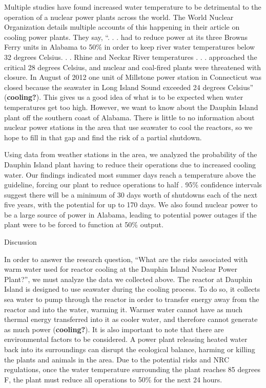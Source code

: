 \documentclass[
  letterpaper,
  DIV=11,
  numbers=noendperiod]{scrreprt}
\begin{document}
Multiple studies have found increased water temperature to be
detrimental to the operation of a nuclear power plants across the world.
The World Nuclear Organization details multiple accounts of this
happening in their article on cooling power plants. They say, ``. . .
had to reduce power at its three Browns Ferry units in Alabama to 50\%
in order to keep river water temperatures below 32 degrees Celsius. . .
Rhine and Neckar River temperatures . . . approached the critical 28
degrees Celsius, and nuclear and coal-fired plants were threatened with
closure. In August of 2012 one unit of Millstone power station in
Connecticut was closed because the seawater in Long Island Sound
exceeded 24 degrees Celsius'' (\textbf{cooling?}). This gives us a good
idea of what is to be expected when water temperatures get too high.
However, we want to know about the Dauphin Island plant off the southern
coast of Alabama. There is little to no information about nuclear power
stations in the area that use seawater to cool the reactors, so we hope
to fill in that gap and find the risk of a partial shutdown.

Using data from weather stations in the area, we analyzed the
probability of the Dauphin Island plant having to reduce their
operations due to increased cooling water. Our findings indicated most
summer days reach a temperature above the guideline, forcing our plant
to reduce operations to half . 95\% confidence intervals suggest there
will be a minimum of 30 days worth of shutdowns each of the next five
years, with the potential for up to 170 days. We also found nuclear
power to be a large source of power in Alabama, leading to potential
power outages if the plant were to be forced to function at 50\% output.

Discussion

In order to answer the research question, ``What are the risks
associated with warm water used for reactor cooling at the Dauphin
Island Nuclear Power Plant?'', we must analyze the data we collected
above. The reactor at Dauphin Island is designed to use seawater during
the cooling process. To do so, it collects sea water to pump through the
reactor in order to transfer energy away from the reactor and into the
water, warming it. Warmer water cannot have as much thermal energy
transferred into it as cooler water, and therefore cannot generate as
much power (\textbf{cooling?}). It is also important to note that there
are environmental factors to be considered. A power plant releasing
heated water back into its surroundings can disrupt the ecological
balance, harming or killing the plants and animals in the area. Due to
the potential risks and NRC regulations, once the water temperature
surrounding the plant reaches 85 degrees F, the plant must reduce all
operations to 50\% for the next 24 hours.
\end{document}

